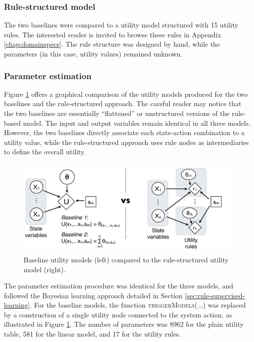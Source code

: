 \subsubsection*{Rule-structured model}

The two baselines were compared to a utility model structured with 15 utility rules. The interested reader is invited to browse these rules in Appendix \ref{chap:domainspecs}. The rule structure was designed by hand, while the parameters (in this case, utility values) remained unknown. 

\subsubsection*{Parameter estimation}

Figure \ref{fig:exp1_baselines} offers a graphical comparison of the utility models produced for the two baselines and the rule-structured approach.  The careful reader may notice that the two baselines are essentially ``flattened'' or unstructured versions of the rule-based model.  The input and output variables remain identical in all three models. However, the two baselines directly associate each state-action combination to a utility value, while the rule-structured approach uses rule nodes as intermediaries to define the overall utility.  


\begin{figure}[h]
\centering
\includegraphics[scale=0.40]{imgs/exp1_baselines.pdf}
\caption{Baseline utility models (left) compared to the rule-structured utility model (right).}
\label{fig:exp1_baselines}
\end{figure}


The parameter estimation procedure was identical for the three models, and followed the Bayesian learning approach detailed in Section \ref{sec:rule-supervised-learning}. For the baseline models, the function \textsc{triggerModels}(...) was replaced by a construction of a single utility node connected to the system action, as illustrated in Figure \ref{fig:exp1_baselines}.  The number of parameters was 8962 for the plain utility table, 581 for the linear model, and 17 for the utility rules.

